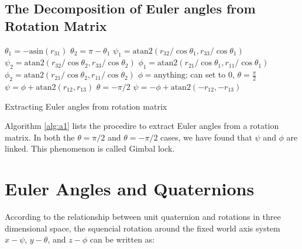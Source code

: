 \documentclass{article}
\begin{document}
\subsection{The Decomposition of Euler angles from Rotation Matrix}
\begin{center}\begin{minipage}[c]{0.7\linewidth}
\begin{algorithm}[H]
\begin{algorithmic}
    \STATE $\theta_1 = −\text{asin}(r_{31})$
    \STATE $\theta_2 = \pi − \theta_1$
    \STATE $\psi_1 = \text{atan2}(r_{32}/\cos{\theta_1}, r_{33}/\cos{\theta_1})$
    \STATE $\psi_2 = \text{atan2}(r_{32}/\cos{\theta_2}, r_{33}/\cos{\theta_2})$
    \STATE $\phi_1 = \text{atan2}(r_{21}/\cos{\theta_1}, r_{11}/\cos{\theta_1})$
    \STATE $\phi_2 = \text{atan2}(r_{21}/\cos{\theta_2}, r_{11}/\cos{\theta_2})$
  \ELSE
    \STATE $\phi = \text{anything}$; can set to 0,
      \STATE $\theta = \frac{\pi}{2}$
      \STATE $\psi = \phi + \text{atan2}(r_{12}, r_{13})$
    \ELSE
      \STATE $\theta = −\pi/2$
      \STATE $\psi = −\phi + \text{atan2}(−r_{12}, −r_{13})$
    \ENDIF
  \ENDIF
\end{algorithmic}
\caption{Extracting Euler angles from rotation matrix}
\label{alg:a1}
\end{algorithm}
\end{minipage}
\end{center}

Algorithm \ref{alg:a1} lists the procedire to extract Euler angles from a rotation matrix. In both the $\theta=\pi/2$ and $\theta=−\pi/2$ cases, we have found that $\psi$ and $\phi$ are linked. This phenomenon is called Gimbal lock. 


\section{Euler Angles and Quaternions}

According to the relationship between unit quaternion and rotations in three dimensional space, the squencial rotation around the fixed world axis system $x-\psi$, $y-\theta$, and $z-\phi$ can be written as:
\end{document}
